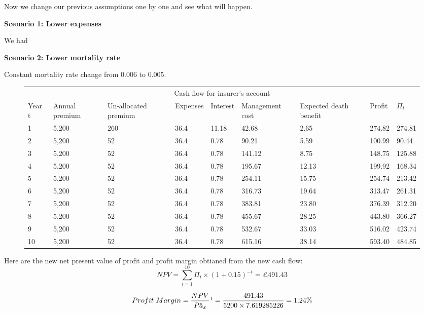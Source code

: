 \documentclass{report}
\begin{document}
Now we change our previous assumptions one by one and see what will happen.

\textbf{Scenario 1: Lower expenses} 

We had 

\textbf{Scenario 2: Lower mortality rate} 

 Constant mortality rate change from 0.006 to 0.005.



\begin{figure}[H]
\hfill
\begin{tabular}{p{0.8cm} p{1.5cm} p{1.5cm} p{1.2cm} p{1cm} p{2cm}p{1.5cm} p{1.5cm} p{1.5cm} }
\toprule
\multicolumn{9}{c}{Cash flow for insurer's account} \\
\cmidrule(r){3-7}

Year t & Annual premium & Un-allocated premium & Expenses & Interest &Management cost& Expected death benefit & Profit& $\Pi_t$  \\
\midrule

1&5,200&260&36.4&11.18&42.68&2.65&274.82&274.81\\
2&5,200&52&36.4&0.78&90.21&5.59&100.99&90.44\\
3&5,200&52&36.4&0.78&141.12&8.75&148.75&125.88\\
4&5,200&52&36.4&0.78&195.67&12.13&199.92&168.34\\
5&5,200&52&36.4&0.78&254.11&15.75&254.74&213.42\\
6&5,200&52&36.4&0.78&316.73&19.64&313.47&261.31\\
7&5,200&52&36.4&0.78&383.81&23.80&376.39&312.20\\
8&5,200&52&36.4&0.78&455.67&28.25&443.80&366.27\\
9&5,200&52&36.4&0.78&532.67&33.03&516.02&423.74\\
10&5,200&52&36.4&0.78&615.16&38.14&\color{red}593.40&\color{red}484.85\\

\bottomrule
\end{tabular}
\end{figure}

Here are the new net present value of profit and profit margin obtianed from the new cash flow:
\[
 NPV=\sum_{i=1}^{10} \Pi_t \times (1+0.15)^{-t} = \pounds 491.43
\]
 


\[
Profit\ Margin =  \frac{NPV}{P \ddot{a}_x}\footnote{$\ddot{a}_x$=$\sum_{i=1}^{10} v^t {_tp_x}$=7.619285226, where $_tp_x$ read from table ?!?!?!? and $v=\frac{1}{1+0.05}$}  = \frac{491.43}{5200 \times 7.619285226} = 1.24\%
\]
\end{document}
